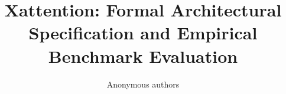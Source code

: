 \title{\textbf{Xattention: Formal Architectural Specification and Empirical Benchmark Evaluation}}

\author{Anonymous authors}
